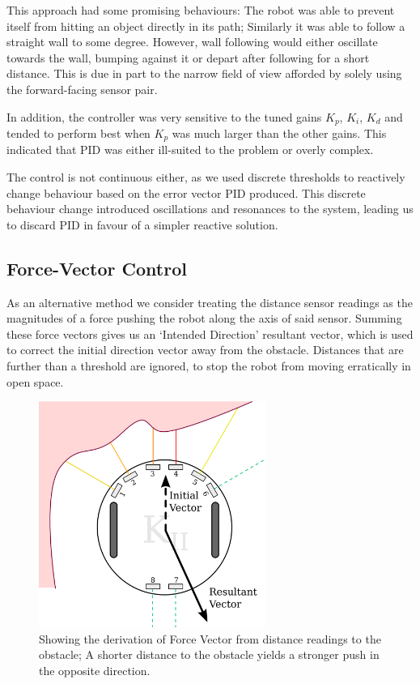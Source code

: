 \documentclass[11pt, a4paper]{article}
\begin{document}
This approach had some promising behaviours: The robot was able to prevent itself 
from hitting an object directly in its path; Similarly it was able to follow 
a straight wall to some degree. However, wall following would either oscillate 
towards the wall, bumping against it or depart after following for a short distance.
This is due in part to the narrow field of view afforded by solely using the forward-facing
sensor pair.

In addition, the controller was very sensitive to the tuned gains ${K_p}$, ${K_i}$,
${K_d}$ and tended to perform best when ${K_p}$ was much larger than the other gains.
This indicated that PID was either ill-suited to the problem or overly complex.

The control is not continuous either, as we used discrete thresholds to reactively 
change behaviour based on the error vector PID produced. This discrete behaviour 
change introduced oscillations and resonances to the system, leading us to discard 
PID in favour of a simpler reactive solution.


\subsection{Force-Vector Control}

As an alternative method we consider treating the distance sensor readings as the 
magnitudes of a force pushing the robot along the axis of said sensor. Summing these 
force vectors gives us an `Intended Direction' resultant vector, which is used to 
correct the initial direction vector away from the obstacle. Distances that are 
further than a threshold are ignored, to stop the robot from moving erratically in 
open space.

\begin{figure}[h]
  \begin{center}
    \includegraphics[width=20em]{../assets/force-vector.png}
    \caption{Showing the derivation of Force Vector from distance readings to the
      obstacle; A shorter distance to the obstacle yields a stronger push in the 
      opposite direction.}
  \end{center}
\end{figure}
\end{document}
